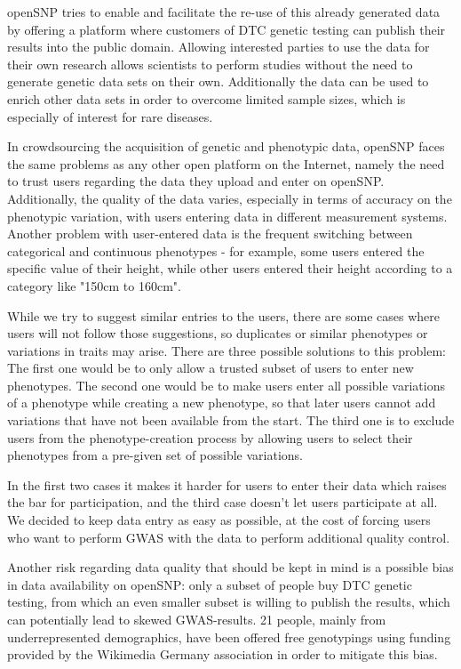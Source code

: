 \documentclass[10pt]{article}
\begin{document}
openSNP tries to enable and facilitate the re-use of this already generated data by offering a platform where customers of DTC genetic testing can publish their results into the public domain. Allowing interested parties to use the data for their own research allows scientists to perform studies without the need to generate genetic data sets on their own. Additionally the data can be used to enrich other data sets in order to overcome limited sample sizes, which is especially of interest for rare diseases. 

In crowdsourcing the acquisition of genetic and phenotypic data, openSNP faces the same problems as any other 
open platform on the Internet, namely the need to trust users regarding the data they upload and enter on openSNP. 
Additionally, the quality of the data varies, especially in terms of accuracy on the phenotypic variation, 
with users entering data in different measurement systems. Another problem with user-entered data is the frequent switching between categorical and continuous phenotypes - for example, some users entered the specific value of their height, while other users entered their height according to a category like "150cm to 160cm". 

While we try to suggest similar entries to the users, 
there are some cases where users will not follow those suggestions, so duplicates or similar phenotypes or variations in traits may arise. There are three possible solutions to this problem: The first one would be to only allow a trusted subset of users to enter new phenotypes. The second one 
would be to make users enter all possible variations of a phenotype while creating a new phenotype, so that later users cannot add 
variations that have not been available from the start. The third one is to exclude users from the phenotype-creation process by allowing users to select their phenotypes from a pre-given set of possible variations.

In the first two cases it makes it harder 
for users to enter their data which raises the bar for participation, and the third case doesn't let users participate at all.
We decided to keep data entry as easy as possible, at the cost of forcing users who want to perform GWAS with the data to perform additional quality control.

Another risk regarding data quality that should be kept in mind is a possible bias in data availability on openSNP: only a subset of people buy DTC genetic testing, from which an even smaller subset is willing to publish the results, which can potentially lead to skewed GWAS-results. 21 people, mainly from underrepresented demographics, have been offered free genotypings using funding provided by the Wikimedia Germany association in order to mitigate this bias. 
\end{document}
